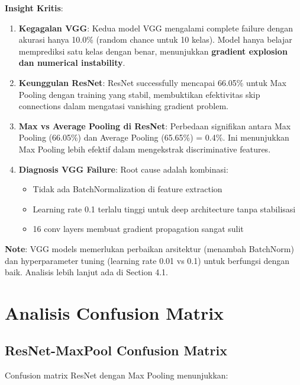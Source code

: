 \documentclass[12pt,a4paper]{report}
\begin{document}
\textbf{Insight Kritis}:

\begin{enumerate}
    \item \textbf{Kegagalan VGG}: Kedua model VGG mengalami complete failure dengan akurasi hanya 10.0\% (random chance untuk 10 kelas). Model hanya belajar memprediksi satu kelas dengan benar, menunjukkan \textbf{gradient explosion dan numerical instability}.
    
    \item \textbf{Keunggulan ResNet}: ResNet successfully mencapai 66.05\% untuk Max Pooling dengan training yang stabil, membuktikan efektivitas skip connections dalam mengatasi vanishing gradient problem.
    
    \item \textbf{Max vs Average Pooling di ResNet}: Perbedaan signifikan antara Max Pooling (66.05\%) dan Average Pooling (65.65\%) = 0.4\%. Ini menunjukkan Max Pooling lebih efektif dalam mengekstrak discriminative features.
    
    \item \textbf{Diagnosis VGG Failure}: Root cause adalah kombinasi:
    \begin{itemize}
        \item Tidak ada BatchNormalization di feature extraction
        \item Learning rate 0.1 terlalu tinggi untuk deep architecture tanpa stabilisasi
        \item 16 conv layers membuat gradient propagation sangat sulit
    \end{itemize}
\end{enumerate}

\textbf{Note}: VGG models memerlukan perbaikan arsitektur (menambah BatchNorm) dan hyperparameter tuning (learning rate 0.01 vs 0.1) untuk berfungsi dengan baik. Analisis lebih lanjut ada di Section 4.1.

\section{Analisis Confusion Matrix}

\subsection{ResNet-MaxPool Confusion Matrix}

Confusion matrix ResNet dengan Max Pooling menunjukkan:
\end{document}
